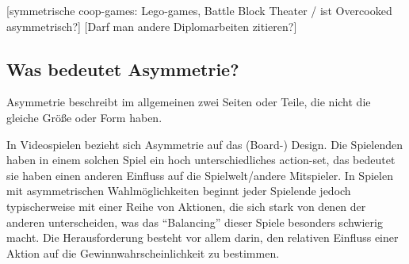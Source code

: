 [symmetrische coop-games: Lego-games, Battle Block Theater / ist Overcooked asymmetrisch?] [Darf man andere Diplomarbeiten zitieren?]

\subsection{Was bedeutet Asymmetrie?}
Asymmetrie beschreibt im allgemeinen zwei Seiten oder Teile, die nicht die gleiche Größe oder Form haben\cite{_oxford_dict}.

In Videospielen bezieht sich Asymmetrie auf das (Board-) Design. Die Spielenden haben in einem solchen Spiel ein hoch unterschiedliches action-set, das bedeutet sie haben einen anderen Einfluss auf die Spielwelt/andere Mitspieler. In Spielen mit asymmetrischen Wahlmöglichkeiten beginnt jeder Spielende jedoch typischerweise mit einer Reihe von Aktionen, die sich stark von denen der anderen unterscheiden, was das "`Balancing"' dieser Spiele besonders schwierig macht. Die Herausforderung besteht vor allem darin, den relativen Einfluss einer Aktion auf die Gewinnwahrscheinlichkeit zu bestimmen.\cite[S. 18]{_balancing_asymmetric_video_games}


